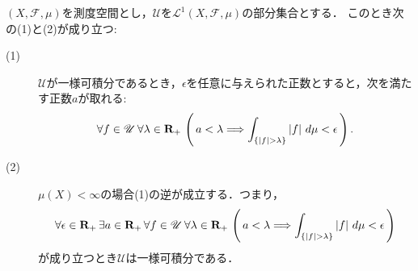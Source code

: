 	\begin{screen}
	\begin{thm}[一様可積分性の同値条件]\label{thm:appendix_uniform_integrability_equivalence}
		$(X,\mathscr{F},\mu)$を測度空間とし，$\mathscr{U}$を$\mathscr{L}^1(X,\mathscr{F},\mu)$の部分集合とする．
		このとき次の(1)と(2)が成り立つ:
		\begin{description}
			\item[(1)] $\mathscr{U}$が一様可積分であるとき，$\epsilon$を任意に与えられた正数とすると，次を満たす正数$a$が取れる:
				\begin{align}
					\forall f \in \mathscr{U}\, \forall \lambda \in \mathbf{R}_+\,
					\left(\, a < \lambda \Longrightarrow \int_{\{|f| > \lambda\}} |f|\ d\mu < \epsilon\, \right).
				\end{align}
			
			\item[(2)] $\mu(X) < \infty$の場合(1)の逆が成立する．つまり，
				\begin{align}
					\forall \epsilon \in \mathbf{R}_+\, \exists a \in \mathbf{R}_+\, 
					\forall f \in \mathscr{U}\, \forall \lambda \in \mathbf{R}_+\,
					\left(\, a < \lambda \Longrightarrow \int_{\{|f| > \lambda\}} |f|\ d\mu < \epsilon\, \right)
				\end{align}
				が成り立つとき$\mathscr{U}$は一様可積分である．
		\end{description}
	\end{thm}
	\end{screen}
	
